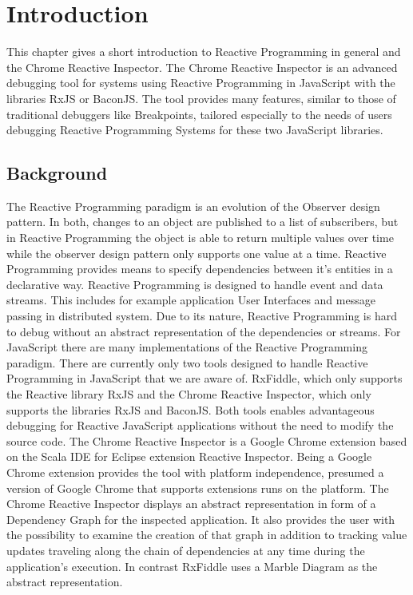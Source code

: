 \chapter{Introduction} \label{ch:Introduction}
This chapter gives a short introduction to Reactive Programming in general and the Chrome Reactive Inspector. The Chrome Reactive Inspector is an advanced debugging tool for systems using Reactive Programming in JavaScript with the libraries RxJS or BaconJS. The tool provides many features, similar to those of traditional debuggers like Breakpoints, tailored especially to the needs of users debugging Reactive Programming Systems for these two JavaScript libraries.

\section{Background}
The Reactive Programming paradigm is an evolution of the Observer design pattern. In both, changes to an object are published to a list of subscribers, but in Reactive Programming the object is able to return multiple values over time while the observer design pattern only supports one value at a time. Reactive Programming provides means to specify dependencies between it's entities in a declarative way. Reactive Programming is designed to handle event and data streams. This includes for example application User Interfaces and message passing in distributed system. Due to its nature, Reactive Programming is hard to debug without an abstract representation of the dependencies or streams.
For JavaScript there are many implementations of the Reactive Programming paradigm. There are currently only two tools designed to handle Reactive Programming in JavaScript that we are aware of. RxFiddle, which only supports the Reactive library RxJS and the Chrome Reactive Inspector, which only supports the libraries RxJS and BaconJS. Both tools enables advantageous debugging for Reactive JavaScript applications without the need to modify the source code. The Chrome Reactive Inspector is a Google Chrome extension based on the Scala IDE for Eclipse extension Reactive Inspector. Being a Google Chrome extension provides the tool with platform independence, presumed a version of Google Chrome that supports extensions runs on the platform.
The Chrome Reactive Inspector displays an abstract representation in form of a Dependency Graph for the inspected application. It also provides the user with the possibility to examine the creation of that graph in addition to tracking value updates traveling along the chain of dependencies at any time during the application's execution.%
In contrast RxFiddle uses a Marble Diagram as the abstract representation.

